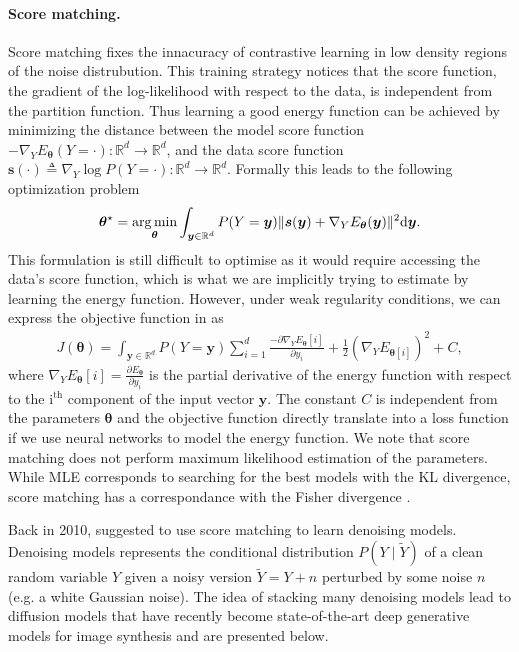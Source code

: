 \paragraph{Score matching.}
Score matching \citep{hyvarinen2005estimation} fixes the innacuracy of contrastive learning in low density regions of the noise distrubution. This training strategy notices that the score function, the gradient of the log-likelihood with respect to the data, is independent from the partition function. Thus learning a good energy function can be achieved by minimizing the distance between the model score function $-\nabla_Y E_{\bm{\theta}}(Y=\cdot): \mathbb{R}^d \rightarrow \mathbb{R}^d$, and the data score function $\bm{s}(\cdot)\triangleq \nabla_Y \log P(Y=\cdot): \mathbb{R}^d \rightarrow \mathbb{R}^d$. Formally this leads to the following optimization problem
\begin{align}
  \bm{\theta}^{\star} = \operatorname*{arg\,min}_{\bm{\theta}} \int_{\bm{y} \in \mathbb{R}^d} P(Y=\bm{y}) \lVert \bm{s}(\bm{y}) + \nabla_Y E_{\bm{\theta}}(\bm{y})\rVert^2 \text{d}\bm{y}. \label{eq:score_matching}
\end{align}
This formulation is still difficult to optimise as it would require accessing the data's score function, which is what we are implicitly trying to estimate by learning the energy function. However, under weak regularity conditions, we can express the objective function in  as
\begin{align}
  J(\bm{\theta}) = \int_{\bm{y} \in \mathbb{R}^d} P(Y=\bm{y}) \sum_{i=1}^d \frac{-\partial \nabla_Y E_{\bm{\theta}}[i]}{\partial y_i } + \frac{1}{2} (\nabla_Y E_{\bm{\theta}[i]})^2 + C,
\end{align}
where $\nabla_Y E_{\bm{\theta}}[i] = \frac{\partial E_{\bm{\theta}}}{\partial y_i}$ is the partial derivative of the energy function with respect to the $\text{i}^{\text{th}}$ component of the input vector $\bm y$. The constant $C$ is independent from the parameters $\bm \theta$ and the objective function directly translate into a loss function if we use neural networks to model the energy function. We note that score matching does not perform maximum likelihood estimation of the parameters. While MLE corresponds to searching for the best models with the KL divergence, score matching has a correspondance with the Fisher divergence \citep{lyu2012interpretation}.

Back in 2010, \citet{vincent2011connection} suggested to use score matching to learn denoising models. Denoising models represents the conditional distribution $P(Y\mid \tilde Y)$ of a clean random variable $Y$ given a noisy version $\tilde{Y} = Y + n$ perturbed by some noise $n$ (e.g. a white Gaussian noise). The idea of stacking many denoising models lead to diffusion models that have recently become state-of-the-art deep generative models for image synthesis and are presented below.

